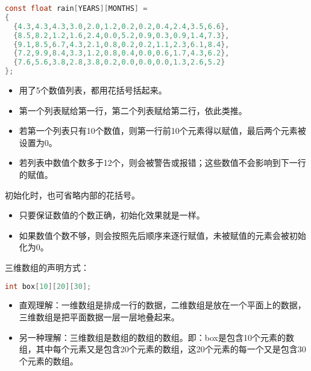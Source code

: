 \begin{frame}[fragile]
\begin{lstlisting}[language=c,backgroundcolor=\color{red!20},basicstyle=\footnotesize\ttfamily]
const float rain[YEARS][MONTHS] =
{
  {4.3,4.3,4.3,3.0,2.0,1.2,0.2,0.2,0.4,2.4,3.5,6.6},
  {8.5,8.2,1.2,1.6,2.4,0.0,5.2,0.9,0.3,0.9,1.4,7.3},
  {9.1,8.5,6.7,4.3,2.1,0.8,0.2,0.2,1.1,2.3,6.1,8.4},
  {7.2,9.9,8.4,3.3,1.2,0.8,0.4,0.0,0.6,1.7,4.3,6.2},
  {7.6,5.6,3.8,2.8,3.8,0.2,0.0,0.0,0.0,1.3,2.6,5.2}
};
\end{lstlisting}
\end{frame}

\begin{frame}[fragile]
\begin{itemize}
\item
用了5个数值列表，都用花括号括起来。\\[0.05in]
\item
第一个列表赋给第一行，第二个列表赋给第二行，依此类推。\\[0.05in]
\item 
若第一个列表只有10个数值，则第一行前10个元素得以赋值，最后两个元素被设置为0。\\[0.05in]
\item 
若列表中数值个数多于12个，则会被警告或报错；这些数值不会影响到下一行的赋值。
\end{itemize}
\end{frame}

\begin{frame}[fragile]
初始化时，也可省略内部的花括号。 \vspace{0.05in}

\begin{itemize}
\item
只要保证数值的个数正确，初始化效果就是一样。\\[0.1in]
\item 
如果数值个数不够，则会按照先后顺序来逐行赋值，未被赋值的元素会被初始化为0。
\end{itemize}
\end{frame}

\begin{frame}[fragile]
三维数组的声明方式：
\begin{lstlisting}[language=c,backgroundcolor=\color{red!20}]
int box[10][20][30];
\end{lstlisting}
\begin{itemize}
\item
直观理解：一维数组是排成一行的数据，二维数组是放在一个平面上的数据，三维数组是把平面数据一层一层地叠起来。\\[0.1in]
\item 
另一种理解：三维数组是数组的数组的数组。即：{\tf box}是包含10个元素的数组，其中每个元素又是包含20个元素的数组，这20个元素的每一个又是包含30个元素的数组。
\end{itemize}
\end{frame}
